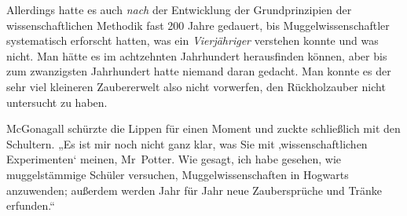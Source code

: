 Allerdings hatte es auch \emph{nach} der Entwicklung der Grundprinzipien der wissenschaftlichen Methodik fast 200 Jahre gedauert, bis Muggelwissenschaftler systematisch erforscht hatten, was ein \emph{Vierjähriger} verstehen konnte und was nicht. Man hätte es im achtzehnten Jahrhundert herausfinden können, aber bis zum zwanzigsten Jahrhundert hatte niemand daran gedacht. Man konnte es der sehr viel kleineren Zaubererwelt also nicht vorwerfen, den Rückholzauber nicht untersucht zu haben.

McGonagall schürzte die Lippen für einen Moment und zuckte schließlich mit den Schultern. „Es ist mir noch nicht ganz klar, was Sie mit ‚wissenschaftlichen Experimenten‘ meinen, Mr~Potter. Wie gesagt, ich habe gesehen, wie muggelstämmige Schüler versuchen, Muggelwissenschaften in Hogwarts anzuwenden; außerdem werden Jahr für Jahr neue Zaubersprüche und Tränke erfunden.“

